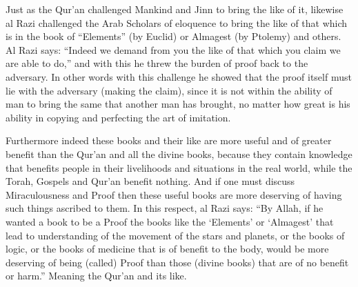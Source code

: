 \documentclass[12pt]{book}
\begin{document}

Just as the Qur’an challenged Mankind and Jinn to bring the like of it,
likewise al Razi challenged the Arab Scholars of eloquence to bring
the like of that which is in the book of “Elements” (by Euclid)
or Almagest (by Ptolemy) and others.
Al Razi says: “Indeed we demand from you the like of that which you claim we
are able to do,”\footnotemark
and with this he threw the burden of proof back to the adversary.
In other words with this challenge he showed that the proof itself must lie
with the adversary (making the claim), since it is not within the ability of
man to bring the same that another man has brought, no matter how great
is his ability in copying and perfecting the art of imitation.


Furthermore indeed these books and their like are more useful and of greater
benefit than the Qur’an and all the divine books, because they contain
knowledge that benefits people in their livelihoods
and situations in the real world,
while the Torah, Gospels and Qur’an benefit nothing.
And if one must discuss Miraculousness and Proof then these useful books
are more deserving of having such things ascribed to them.
In this respect, al Razi says: “By Allah, if he wanted a book to be a
Proof the books like the ‘Elements’ or ‘Almagest’ that lead to understanding
of the movement of the stars and planets, or the books of logic,
or the books of medicine that is of benefit to the body,
would be more deserving of being (called) Proof than those (divine books)
that are of no benefit or harm.”\footnotemark
Meaning the Qur’an and its like.
\end{document}
